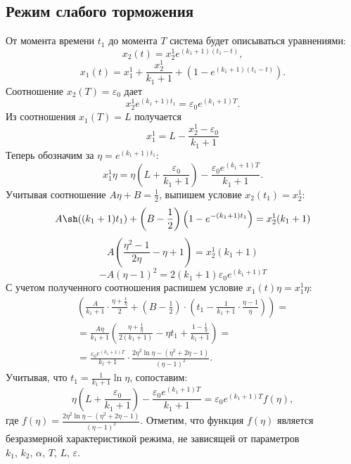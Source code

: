 \subsection{Режим слабого торможения}

От момента времени $t_1$ до момента $T$ система будет описываться уравнениями:
\begin{equation} \label{eq:firslim_weak_x2}
        x_2(t) = x_2^1e^{(k_1+ 1)(t_1 - t)},
\end{equation}
\begin{equation} \label{eq:firslim_weak_x1}
        x_1(t) = x_1^1 + \frac{x_2^1}{k_1+1}+\left(1 - e^{(k_1+ 1)(t_1 - t)}\right).
\end{equation}
Соотношение $x_2(T) = \varepsilon_0$ дает
$$
        x_2^1e^{(k_1+1)t_1} = \varepsilon_0e^{(k_1+1)T}.
$$
Из соотношения $x_1(T) = L$ получается
$$
        x_1^1 = L - \frac{x_2^1 - \varepsilon_0}{k_1 + 1}
$$
Теперь обозначим за $\eta = e^{(k_1+1)t_1}$:
$$
        x_1^1\eta = \eta\left(L+\frac{\varepsilon_0}{k_1 + 1}\right) - \frac{\varepsilon_0e^{(k_1 + 1)T}}{k_1 + 1}.
$$
Учитывая соотношение $A\eta + B = \frac{1}{2}$, выпишем условие $x_2(t_1) = x_2^1$:
$$
        A\sh((k_1+1)t_1) + \left(B - \frac{1}{2}\right)\left(1 - e^{-(k_1+1)t_1}\right) = x_2^1(k_1 + 1)
$$
$$
        A\left(\frac{\eta^2-1}{2\eta} - \eta + 1\right) = x_2^1(k_1 + 1)
$$
$$
        -A(\eta - 1)^2 = 2(k_1+1)\varepsilon_0e^{(k_1 + 1)T}
$$
С учетом полученного соотношения распишем условие $x_1(t)\eta = x_1^1\eta$:
\begin{multline}
        \left(\frac{A}{k_1 + 1}\cdot \frac{\eta + \frac1\eta}2 + \left(B - \frac12\right)\cdot\left(t_1 - \frac1{k_1+1}\cdot\frac{\eta - 1}{\eta}\right)\right) =\\=\frac{A\eta}{k_1 + 1}\left(\frac{\eta + \frac1\eta}{2(k_1+1)} - \eta t_1 + \frac{1 - \frac1\eta}{k_1+1}\right) =\\=\frac{\varepsilon_0e^{(k_1+1)T}}{k_1 + 1} \cdot \frac{2\eta^2\ln\eta - (\eta^2 + 2\eta - 1)}{(\eta - 1)^2}.
\end{multline}
Учитывая, что $t_1 = \frac1{k_1 + 1}\ln\eta$, сопоставим:
\begin{equation}\label{eq:weak_find_eta}
        \eta\left(L + \frac{\varepsilon_0}{k_1+1}\right) - \frac{\varepsilon_0e^{(k_1+1)T}}{k_1+1} = \varepsilon_0e^{(k_1+1)T}f(\eta),
\end{equation}
где $f(\eta) = \frac{2\eta^2\ln\eta - (\eta^2 + 2\eta - 1)}{(\eta-1)^2}$. Отметим, что функция $f(\eta)$ является безразмерной характеристикой режима, не зависящей от параметров $k_1,\,k_2,\,\alpha,\,T,\,L,\,\varepsilon$.


